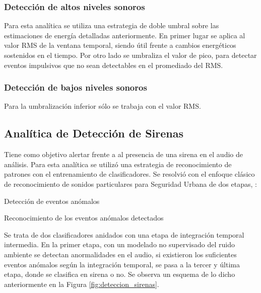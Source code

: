\documentclass{article}
\begin{document}
\subsubsection{Detección de altos niveles sonoros}
Para esta analítica se utiliza una estrategia de doble umbral sobre las estimaciones de energía detalladas anteriormente. En primer lugar se aplica al valor RMS de la ventana temporal, siendo útil frente a cambios energéticos sostenidos en el tiempo. Por otro lado se umbraliza el valor de pico, para detectar eventos impulsivos que no sean detectables en el promediado del RMS.

\subsubsection{Detección de bajos niveles sonoros}
Para la umbralización inferior sólo se trabaja con el valor RMS.

\subsection{Analítica de Detección de Sirenas}
\label{deteccion de sirenas}
Tiene como objetivo alertar frente a al presencia de una sirena en el audio de análisis. Para esta analítica se utilizó una estrategia de reconocimiento de patrones con el entrenamiento de clasificadores. Se resolvió con el enfoque clásico de reconocimiento de sonidos particulares para Seguridad Urbana de dos etapas, \cite{lecomte2011abnormal}:
\begin{enumerate}
\begin{item}
Detección de eventos anómalos
\end{item}
\begin{item}
Reconocimiento de los eventos anómalos detectados
\end{item}
\end{enumerate}

Se trata de dos clasificadores anidados con una etapa de integración temporal intermedia. En la primer etapa, con un modelado no supervisado del ruido ambiente se detectan anormalidades en el audio, si existieron los suficientes eventos anómalos según la integración temporal, se pasa a la tercer y última etapa, donde se clasifica en sirena o no. Se observa un esquema de lo dicho anteriormente en la Figura \ref{fig:deteccion_sirenas}. 
 
\end{document}
